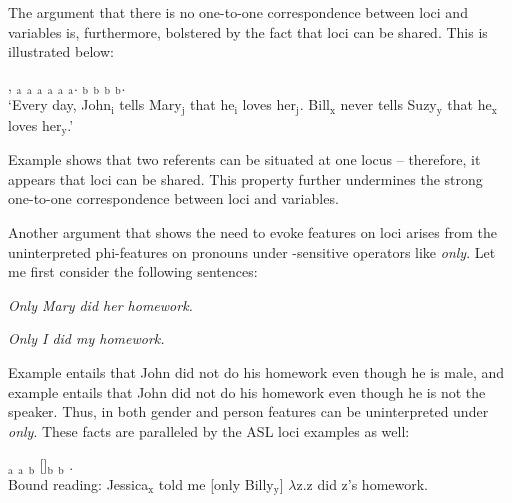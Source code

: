 \documentclass[output=paper,
modfonts
]{langscibook}
\begin{document}
The argument that there is no one-to-one correspondence between loci and variables is, furthermore, bolstered by the fact that loci can be shared. This is illustrated below: 

\begin{exe} 
	\ex \label{ex:irani:69} , $_\text{a}$ $_\text{a}$  $_\text{a}$ $_\text{a}$ $_\text{a}$  $_\text{a}$. $_\text{b}$ $_\text{b}$ $_\text{b}$  $_\text{b}$. \\
	`Every day, John$_\text{i}$ tells Mary$_\text{j}$ that he$_\text{i}$ loves her$_\text{j}$. Bill$_\text{x}$ never tells Suzy$_\text{y}$ that he$_\text{x}$ loves her$_\text{y}$.’  
\end{exe} 

Example  shows that two referents can be situated at one locus -- therefore, it appears that loci can be shared. This property further undermines the strong one-to-one correspondence between loci and variables.  

Another argument that shows the need to evoke features on loci arises from the uninterpreted phi-features on pronouns under -sensitive operators like \textit{only}. Let me first consider the following  sentences: 

\begin{exe} 
	\ex \begin{xlist}
		\ex \label{ex:irani:70} \textit{Only Mary did her homework.}
		
		\ex \label{ex:irani:71} \textit{Only I did my homework.}
	    \end{xlist} 
\end{exe} 

Example  entails that John did not do his homework even though he is male, and example  entails that John did not do his homework even though he is not the speaker. Thus, in  both gender and person features can be uninterpreted under \textit{only}. These facts are paralleled by the ASL loci examples as well:\largerpage

\begin{exe} 
	\ex {}$_\text{a}$ $_\text{a}$  $_\text{b}$ []$_\text{b}$ $_\text{b}$ .\\
	Bound reading: Jessica$_\text{x}$ told me [only Billy$_\text{y}$] \(\lambda\)z.z did z’s homework. \citep[9]{Kuhn2015}
\end{exe}
\end{document}
